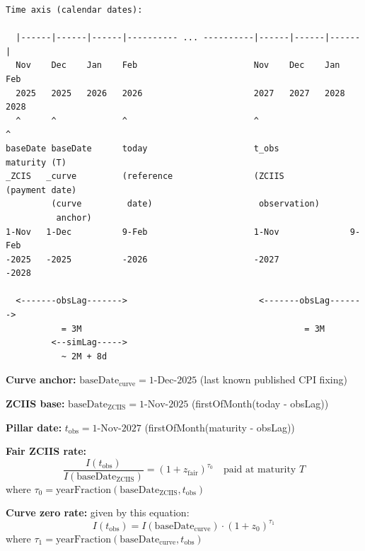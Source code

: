 \documentclass[11pt,a4paper]{article}
\begin{document}
\begin{verbatim}
Time axis (calendar dates):

  |------|------|------|---------- ... ----------|------|------|------|
  Nov    Dec    Jan    Feb                       Nov    Dec    Jan    Feb
  2025   2025   2026   2026                      2027   2027   2028   2028
  ^      ^             ^                         ^                    ^
baseDate baseDate      today                     t_obs              maturity (T)
_ZCIS   _curve         (reference                (ZCIIS              (payment date)
         (curve         date)                     observation)
          anchor)
1-Nov   1-Dec          9-Feb                     1-Nov              9-Feb
-2025   -2025          -2026                     -2027              -2028

  <-------obsLag------->                          <-------obsLag------->
           = 3M                                            = 3M
         <--simLag----->
           ~ 2M + 8d
\end{verbatim}

\noindent\textbf{Curve anchor:}  
$\text{baseDate}_\text{curve} = \text{1-Dec-2025}$ (last known published CPI fixing)

\noindent\textbf{ZCIIS base:}  
$\text{baseDate}_\text{ZCIIS} = \text{1-Nov-2025}$ (firstOfMonth(today - obsLag))

\noindent\textbf{Pillar date:}  
$t_\text{obs} = \text{1-Nov-2027}$ (firstOfMonth(maturity - obsLag))

\noindent\textbf{Fair ZCIIS rate:}
\begin{equation}
\frac{I(t_\text{obs})}{I(\text{baseDate}_\text{ZCIIS})} = (1 + z_\text{fair})^{\tau_0} \quad \text{paid at maturity } T
\end{equation}
where $\tau_0 = \text{yearFraction}(\text{baseDate}_\text{ZCIIS}, t_\text{obs})$

\noindent\textbf{Curve zero rate:} given by this equation:
\begin{equation}
I(t_\text{obs}) = I(\text{baseDate}_\text{curve}) \cdot (1 + z_0)^{\tau_1}
\end{equation}
where $\tau_1 = \text{yearFraction}(\text{baseDate}_\text{curve}, t_\text{obs})$
\end{document}
